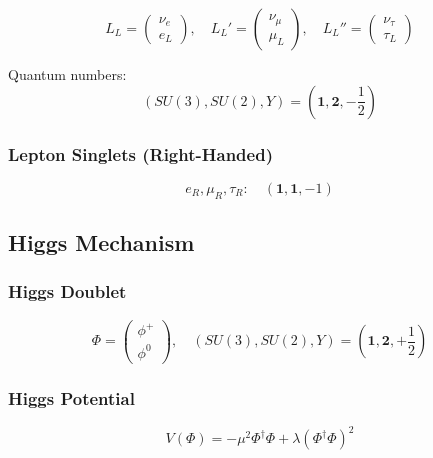 \begin{equation}
L_L = \begin{pmatrix} \nu_e \\ e_L \end{pmatrix}, \quad
L_L' = \begin{pmatrix} \nu_\mu \\ \mu_L \end{pmatrix}, \quad
L_L'' = \begin{pmatrix} \nu_\tau \\ \tau_L \end{pmatrix}
\end{equation}

Quantum numbers:
\begin{equation}
(SU(3), SU(2), Y) = (\mathbf{1}, \mathbf{2}, -\frac{1}{2})
\end{equation}

\subsubsection{Lepton Singlets (Right-Handed)}

\begin{equation}
e_R, \mu_R, \tau_R : \quad (\mathbf{1}, \mathbf{1}, -1)
\end{equation}

\subsection{Higgs Mechanism}

\subsubsection{Higgs Doublet}

\begin{equation}
\Phi = \begin{pmatrix} \phi^+ \\ \phi^0 \end{pmatrix}, \quad (SU(3), SU(2), Y) = (\mathbf{1}, \mathbf{2}, +\frac{1}{2})
\end{equation}

\subsubsection{Higgs Potential}

\begin{equation}
V(\Phi) = -\mu^2 \Phi^\dagger\Phi + \lambda(\Phi^\dagger\Phi)^2
\end{equation}

